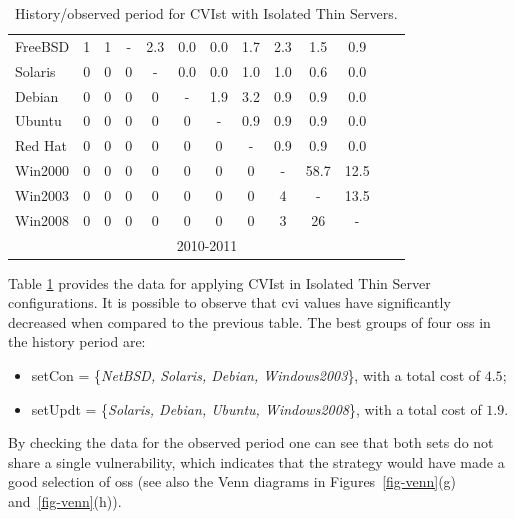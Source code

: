 \begin{table}[!ht]
\begin{center}
{\begin{tabular}{|l|c|c|c|c|c|c|c|c|c|c|c|c|}
FreeBSD & 1 & 1 & - & 2.3 & 0.0 & 0.0 & 1.7 & 2.3 & 1.5 & 0.9&\\ \cline{1-11}
Solaris & 0 & 0 & 0 & - & 0.0 & 0.0 & 1.0 & 1.0 & 0.6 & 0.0&\\ \cline{1-11}
Debian & 0 & 0 & 0 & 0 & - & 1.9 & 3.2 & 0.9 & 0.9 & 0.0&\\ \cline{1-11}
Ubuntu & 0 & 0 & 0 & 0 & 0 &  - & 0.9 & 0.9 & 0.9 & 0.0&\\ \cline{1-11}
Red Hat & 0 & 0 & 0 & 0 & 0 & 0 &- & 0.9 & 0.9 & 0.0&\\ \cline{1-11}
Win2000 & 0 & 0 & 0 & 0 & 0 & 0 & 0 & - & 58.7 & 12.5&\\ \cline{1-11}
Win2003 & 0 & 0 & 0 & 0 & 0 & 0 & 0 & 4 & - & 13.5&\\ \cline{1-12}
Win2008 & 0 & 0 & 0 & 0 & 0 & 0 & 0 & 3 & 26 & -&\multicolumn{1}{|c}{}  \\ \cline{1-11}
 \multicolumn{1}{c|}{}& \multicolumn{9}{|c|}{2010-2011} & \multicolumn{2}{|c}{}\\ \cline{2-10}
\end{tabular}
\caption{History/observed period for CVIst with Isolated Thin Servers.}
\label{tab:strat_ii_iso}
}
\end{center}
\end{table}




Table \ref{tab:strat_ii_iso} provides the data for applying CVIst in Isolated Thin Server configurations. 
It is possible to observe that \gls{cvi} values have significantly decreased when compared to the previous table. 
The best groups of four \glspl{os} in the history period are:
 
\begin{itemize}
\item setCon = \{\emph{NetBSD, Solaris, Debian, Windows2003}\}, with a total cost of $4.5$;
\item setUpdt = \{\emph{Solaris, Debian, Ubuntu, Windows2008}\}, with a total cost of $1.9$.
\end{itemize}

By checking the data for the observed period one can see that both sets do not share a single vulnerability, which indicates that the strategy would have made a good selection of \glspl{os} (see also the Venn diagrams in Figures~\ref{fig-venn}(g) and~\ref{fig-venn}(h)).


